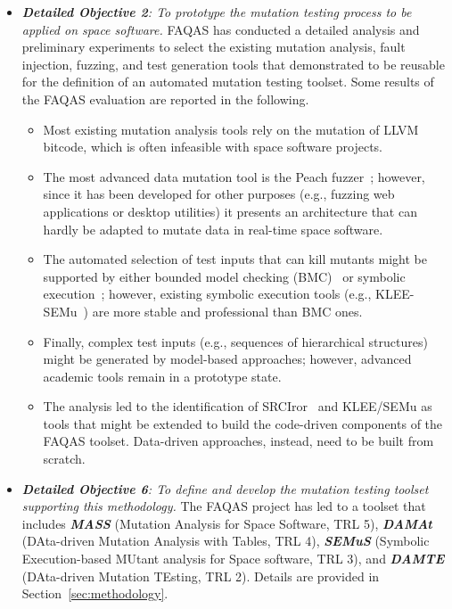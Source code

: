 \begin{itemize}
\item {\emph{\textbf{Detailed Objective 2}: To prototype the mutation testing process to be applied on space software.}}
FAQAS has conducted a detailed analysis and preliminary experiments to select the existing mutation analysis, fault injection, fuzzing, and test generation tools that demonstrated to be reusable for the definition of an automated mutation testing toolset. Some results of the FAQAS evaluation are reported in the following.
\begin{itemize}
\item	Most existing mutation analysis tools rely on the mutation of LLVM~\cite{LLVM} bitcode, which is often infeasible with space software projects.
\item The most advanced data mutation tool is the Peach fuzzer~\cite{PeachMozilla}; however, since it has been developed for other purposes (e.g., fuzzing web applications or desktop utilities) it presents an architecture that can hardly be adapted to mutate data in real-time space software.
\item The automated selection of test inputs that can kill mutants might be supported by either bounded model checking (BMC)~\cite{CBMC} or symbolic execution~\cite{cadar2008klee}; however, existing symbolic execution tools (e.g., KLEE-SEMu~\cite{SEMU}) are more stable and professional than BMC ones.
\item Finally, complex test inputs (e.g., sequences of hierarchical structures) might be generated by model-based approaches; however, advanced academic tools remain in a prototype state.
\item The analysis led to the identification of SRCIror~\cite{hariri2018srciror} and KLEE/SEMu as tools that might be extended to build the code-driven components of the FAQAS toolset. Data-driven approaches, instead, need to be built from scratch.
\end{itemize}

\item {\emph{\textbf{Detailed Objective 6}: To define and develop the mutation testing toolset supporting this methodology.}} The FAQAS project has led to a toolset that includes \textbf{\emph{MASS}} (Mutation Analysis for Space Software, TRL 5),
\textbf{\emph{DAMAt}} (DAta-driven Mutation Analysis with Tables, TRL 4),
\textbf{\emph{SEMuS}} (Symbolic Execu\-tion-based MUtant analysis for Space software, TRL 3),
and \textbf{\emph{DAMTE}} (DAta-driven Mutation TEsting, TRL 2).
Details are provided in Section~\ref{sec:methodology}.



\end{itemize}
